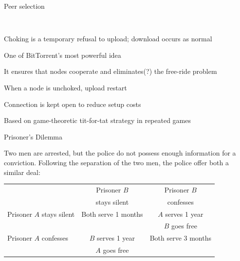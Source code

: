 \begin{frame}{Peer selection}

\\
\BIL	
\item Choking is a temporary refusal to upload; download occurs as normal
\item One of BitTorrent’s most powerful idea
\item It ensures that nodes cooperate and eliminates(?) the free-ride problem
\item When a node is unchoked, upload restart
\item Connection is kept open to reduce setup costs
\item Based on \alert{game-theoretic tit-for-tat strategy in repeated games}
\EIL

\end{frame}

\begin{frame}{Prisoner's Dilemma}

Two men are arrested, but the police do not possess enough information 
for a conviction. Following the separation of the two men, the police offer 
both a similar deal:
	
\begin{table}
\begin{tabular}{|l||c|c|}
\hline
  & Prisoner $B$ & Prisoner $B$ \\
  & stays silent & confesses \\
\hline\hline
Prisoner $A$ stays silent & Both serve 1 months & $A$ serves 1 year \\
                        &                     & $B$ goes free \\
\hline
Prisoner $A$ confesses & $B$ serves 1 year & Both serve 3 months \\
                        & $A$ goes free &  \\
\hline
\end{tabular}
\end{table}
	
\end{frame}

